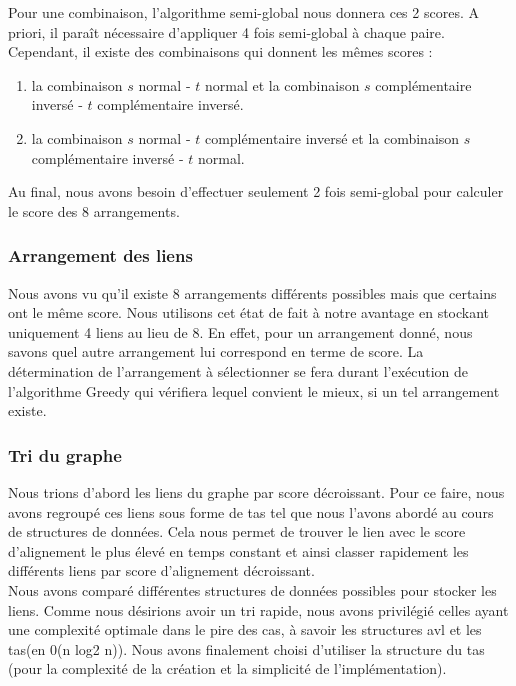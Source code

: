 \documentclass{article}
\begin{document}
Pour une combinaison, l'algorithme semi-global nous donnera ces 2 scores. A priori, il paraît nécessaire d'appliquer 4 fois semi-global à chaque paire. Cependant, il existe des combinaisons qui donnent les mêmes scores : 
\begin{enumerate}
\item la combinaison $s$ normal - $t$ normal et la combinaison $s$ complémentaire inversé - $t$ complémentaire inversé.
\item la combinaison $s$ normal - $t$ complémentaire inversé et la combinaison $s$ complémentaire inversé - $t$ normal.
\end{enumerate}
Au final, nous avons besoin d'effectuer seulement 2 fois semi-global pour calculer le score des 8 arrangements.

\subsubsection{Arrangement des liens}
Nous avons vu qu'il existe 8 arrangements différents possibles mais que certains ont le même score. Nous utilisons cet état de fait à notre avantage en stockant uniquement 4 liens au lieu de 8. En effet, pour un arrangement donné, nous savons quel autre arrangement lui correspond en terme de score. La détermination de l'arrangement à sélectionner se fera durant l'exécution de l'algorithme Greedy qui vérifiera lequel convient le mieux, si un tel arrangement existe.

\subsubsection{Tri du graphe}
Nous trions d'abord les liens du graphe par score décroissant. Pour ce faire, nous avons regroupé ces liens sous forme de tas tel que nous l'avons abordé au cours de structures de données. Cela nous permet de trouver le lien avec le score d'alignement le plus élevé en temps constant et ainsi classer rapidement les différents liens par score d'alignement décroissant.
\\

Nous avons comparé différentes structures de données possibles pour stocker les liens. Comme nous désirions avoir un tri rapide, nous avons privilégié celles ayant une complexité optimale dans le pire des cas, à savoir les structures avl et les tas(en 0(n log2 n)).
Nous avons finalement choisi d'utiliser la structure du tas (pour la complexité de la création et la simplicité de l'implémentation).
\end{document}
